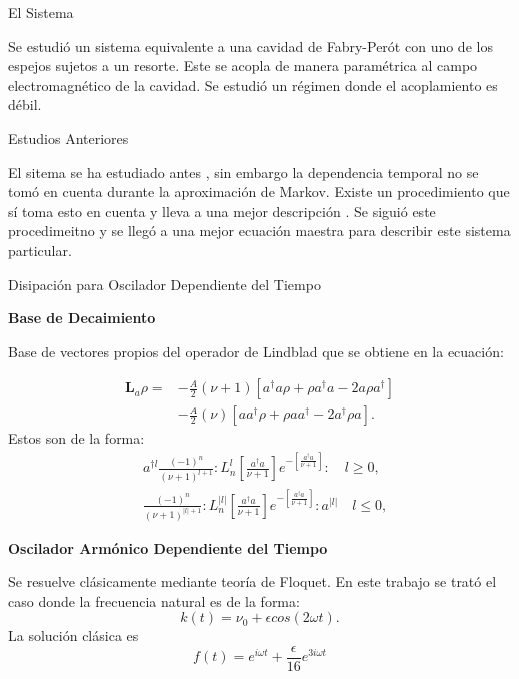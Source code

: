 \documentclass[11pt]{beamer}
\begin{document}
\begin{frame}{El Sistema}

Se estudió un sistema equivalente a una cavidad de Fabry-Perót con uno de los espejos sujetos a un resorte. Este se acopla de manera paramétrica al campo electromagnético de la cavidad. Se estudió un régimen donde el acoplamiento es débil.

\end{frame}

\begin{frame}{Estudios Anteriores}

El sitema se ha estudiado antes \cite{BarberisLC}, sin embargo la dependencia temporal no se tomó en cuenta durante la aproximación de Markov. Existe un procedimiento que sí toma esto en cuenta y lleva a una mejor descripción \cite{HanngiFM}. Se siguió este procedimeitno y se llegó a una mejor ecuación maestra para describir este sistema particular.

\end{frame}

\begin{frame}{Disipación para Oscilador Dependiente del Tiempo}

\textbf{Base de Decaimiento}

Base de vectores propios del operador de Lindblad que se obtiene en la ecuación:

\begin{align}\label{OsciladorLindblad}
\textbf{L}_a \rho =& - \frac{A}{2}(\nu + 1)[a^\dagger a\rho + \rho a^\dagger a -2a\rho a^\dagger] \nonumber \\
 &- \frac{A}{2}(\nu)[ aa^\dagger\rho + \rho  aa^\dagger -2a^\dagger\rho a].
\end{align} Estos son de la forma:
\begin{align}\label{DampingBasis}
&a^{\dagger l}\frac{(-1)^n}{(\nu+1)^{l+1}}:L_n^l[\frac{a^\dagger a}{\nu+1}]e^{-[\frac{a^\dagger a}{\nu+1}]}:\quad l \geq 0, \\
&\frac{(-1)^n}{(\nu+1)^{|l|+1}}:L_n^{|l|}[\frac{a^\dagger a}{\nu+1}]e^{-[\frac{a^\dagger a}{\nu+1}]}:a^{|l|}\quad l \leq 0,
\end{align}
\end{frame}

\begin{frame}
\textbf{Oscilador Armónico Dependiente del Tiempo}

Se resuelve clásicamente mediante teoría de Floquet\cite{WardFT}. En este trabajo se trató el caso donde la frecuencia natural es de la forma:
\begin{equation}
k(t) = \nu_0 + \epsilon cos(2\omega t).
\end{equation} La solución clásica es
\begin{equation}
f(t)= e^{i\omega t} + \frac{\epsilon}{16} e^{3i\omega t}
\end{equation}

\end{frame}
\end{document}

